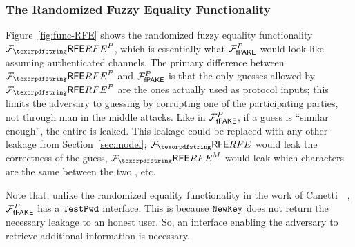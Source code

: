 
\subsubsection{The Randomized Fuzzy Equality Functionality}
\label{sec:rfe}

Figure~\ref{fig:func-RFE} shows the randomized fuzzy equality functionality $\Frfe^{P}$, which is essentially what $\mathcal{F}_\textsf{fPAKE}^{P}$ would look like assuming authenticated channels.
The primary difference between $\Frfe^{P}$ and $\mathcal{F}_\textsf{fPAKE}^{P}$ is that the only \password guesses allowed by $\Frfe^{P}$ are the ones actually used as protocol inputs; this limits the adversary to guessing by corrupting one of the participating parties, not through man in the middle attacks.
Like in $\mathcal{F}_\textsf{fPAKE}^{P}$, if a \password guess is ``similar enough'', the entire \password is leaked. This leakage could be replaced with any other leakage from Section~\ref{sec:model}; $\Frfe$ would leak the correctness of the guess, $\Frfe^{M}$ would leak which characters are the same between the two \passwords, etc.

Note that, unlike the randomized equality functionality in the work of Canetti~\etal~\cite{PKC:CDVW12}, $\mathcal{F}_\textsf{fPAKE}^P$ has a $\texttt{TestPwd}$ interface. 
This is because $\texttt{NewKey}$ does not return the necessary leakage to an honest user.
So, an interface enabling the adversary to retrieve additional information is necessary.

